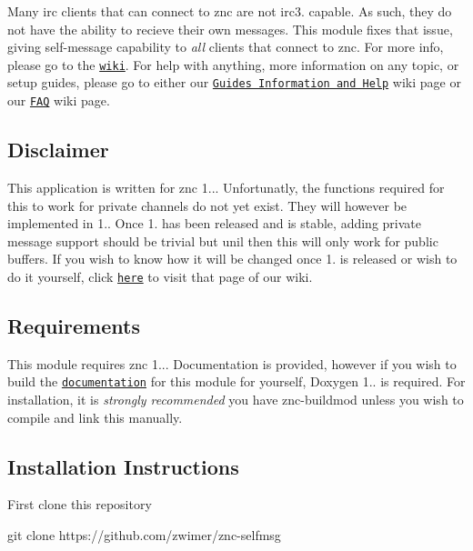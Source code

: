 Many irc clients that can connect to znc are not \textquotesingle{}irc3. capable\textquotesingle{}. As such, they do not have the ability to recieve their own messages. This module fixes that issue, giving self-\/message capability to {\itshape all} clients that connect to znc. For more info, please go to the \href{https://github.com/zwimer/znc-selfmsg/wiki}{\tt wiki}. For help with anything, more information on any topic, or setup guides, please go to either our \href{https://github.com/zwimer/znc-selfmsg/wiki/Guides,-Information,-and-Help}{\tt Guides Information and Help} wiki page or our \href{https://github.com/zwimer/znc-selfmsg/wiki/FAQ}{\tt F\+AQ} wiki page.

\subsection*{Disclaimer}

This application is written for znc 1... Unfortunatly, the functions required for this to work for private channels do not yet exist. They will however be implemented in 1.. Once 1. has been released and is stable, adding private message support should be trivial but unil then this will only work for public buffers. If you wish to know how it will be changed once 1. is released or wish to do it yourself, click \href{https://github.com/zwimer/znc-selfmsg/wiki/Changes-for-Private-Channels}{\tt here} to visit that page of our wiki.

\subsection*{Requirements}

This module requires znc 1... Documentation is provided, however if you wish to build the \href{#documentation}{\tt documentation} for this module for yourself, Doxygen 1.. is required. For installation, it is {\itshape strongly recommended} you have znc-\/buildmod unless you wish to compile and link this manually.

\subsection*{Installation Instructions}

First clone this repository 
\begin{DoxyCode}
git clone https://github.com/zwimer/znc-selfmsg
\end{DoxyCode}


